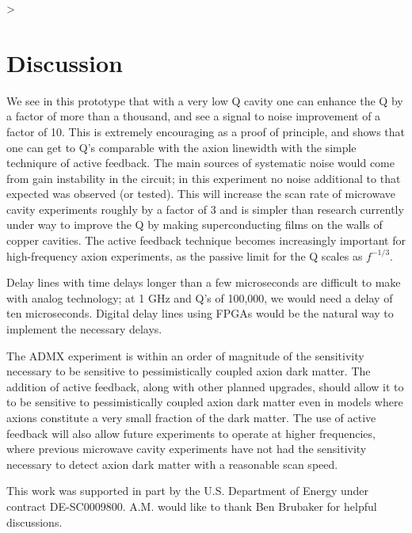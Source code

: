 >\documentclass[aps,prl,twocolumn,groupedaddress]{revtex4-1}
\begin{document}
\section{Discussion}

We see in this prototype that with a very low Q cavity one can enhance the Q by a factor of more than a thousand, and see a signal to noise improvement of a factor of 10. This is extremely encouraging as a proof of principle, and shows that one can get to Q's comparable with the axion linewidth with the simple techniqure of active feedback. The main sources of systematic noise would come from gain instability in the circuit; in this experiment no noise additional to that expected was observed (or tested). This will increase the scan rate of microwave cavity experiments roughly by a factor of 3 and is simpler than research currently under way to improve the Q by making superconducting films on the walls of copper cavities. The active feedback technique becomes increasingly important for high-frequency axion experiments, as the passive limit for the Q scales as $f^{-1/3}$.

Delay lines with time delays longer than a few microseconds are difficult to make with analog technology; at 1 GHz and Q's of 100,000, we would need a delay of ten microseconds. Digital delay lines using FPGAs would be the natural way to implement the necessary delays.


The ADMX experiment is within an order of magnitude of the sensitivity necessary to be sensitive to pessimistically coupled axion dark matter.  The addition of active feedback, along with other planned upgrades, should allow it to to be sensitive to pessimistically coupled axion dark matter even in models where axions constitute a very small fraction of the dark matter.  The use of active feedback will also allow future experiments to operate at higher frequencies, where previous microwave cavity experiments have not had the sensitivity necessary to detect axion dark matter with a reasonable scan speed.

This work was supported in part by the U.S. Department of Energy under contract DE-SC0009800. A.M. would like to thank Ben Brubaker for helpful discussions.


\end{document}
